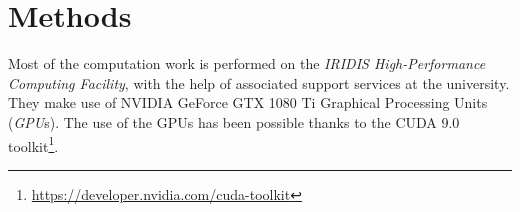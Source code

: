 \chapter{Methods} \label{Chapter: Methods}






Most of the computation work is performed on the \textit{IRIDIS High-Performance Computing Facility}, with the help of associated support services at the university. They make use of NVIDIA\textregistered$ $ GeForce GTX 1080 Ti Graphical Processing Units (\textit{GPU}s). The use of the GPUs has been possible thanks to the CUDA 9.0 toolkit\footnote{\url{https://developer.nvidia.com/cuda-toolkit}}.

